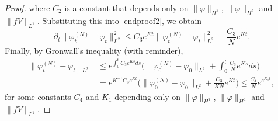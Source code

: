 \documentclass[11pt,a4paper,draft,DIV11]{scrartcl}	%
\begin{document}
\begin{proof}
  where $C_2$ is a constant that depends only on $\| \varphi \|_{H^1}$, $\|
  \varphi \|_{H^2}$ and $\| fV \|_{L^1}$. Substituting this into
  \eqref{endproof2}, we obtain
  \[
    \partial_t \| \varphi_t^{(N)} - \varphi_t \|_{L^2}^2 \le C_3 e^{Kt} \|
    \varphi_t^{(N)} - \varphi_t \|_{L^2}^2 + \frac{C_3}{N} e^{Kt}.
  \]
  Finally, by Gronwall's inequality (with reminder),
  \begin{align*}
    \| \varphi_t^{(N)} - \varphi_t \|_{L^2} & \le e^{\int_0^t C_3 e^{Ks} ds}
    \Big( \| \varphi_0^{(N)} - \varphi_0 \|_{L^2} + \int_0^t \frac{C_3}{N}
    e^{Ks} ds \big) \\
    & = e^{K^{-1} C_3 e^{Kt}} \Big( \| \varphi_0^{(N)} - \varphi_0 \|_{L^2}
    + \frac{C_3}{KN} e^{Kt} \Big) \le \frac{C_4}{N} e^{e^{K_1 t}},
  \end{align*}
  for some constants $C_4$ and $K_1$ depending only on $\| \varphi
  \|_{H^1}$, $\| \varphi \|_{H^2}$ and $\| fV \|_{L^1}$.
\end{proof}
\end{document}
